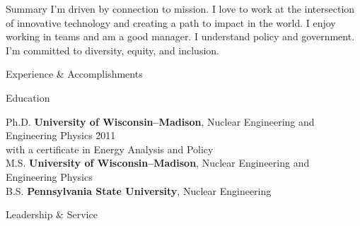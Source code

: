 \documentclass{resume3} %
\begin{document}
\begin{rSection}{Summary}
I'm driven by connection to mission. I love to work at the intersection of innovative technology and creating a path to impact in the world. I enjoy working in teams and am a good manager. I understand policy and government. I'm committed to diversity, equity, and inclusion. 
\end{rSection}

\begin{rSection}{Experience \& Accomplishments}

\end{rSection}

%


\begin{rSection}{Education}

\begin{tabbing}
Ph.D. \hspace*{1 em}\= \textbf{University of Wisconsin--Madison}, Nuclear Engineering and Engineering Physics \hspace*{1em} \= 2011 \\
      \> with a certificate in Energy Analysis and Policy \\
%
M.S. \hspace*{1 em}\> \textbf{University of Wisconsin--Madison}, Nuclear Engineering and Engineering Physics   \\
%
B.S. \hspace*{1 em}\> \textbf{Pennsylvania State University}, Nuclear Engineering  
\end{tabbing}
\end{rSection}
\vspace*{0.5em}
\begin{rSection}{Leadership \& Service}

\end{rSection}
\end{document}

